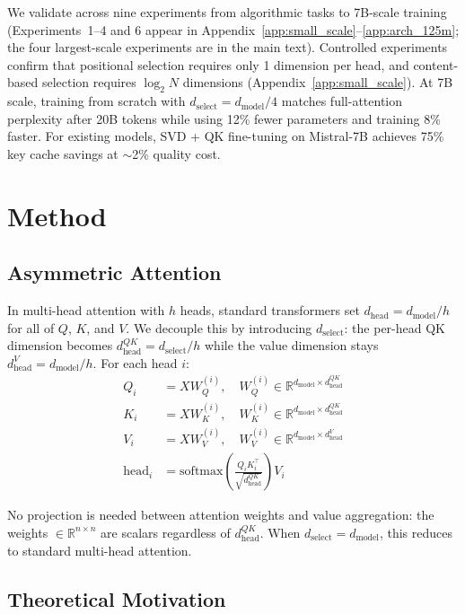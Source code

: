 \documentclass{article} %
\newcommand{\dmodel}{d_{\text{model}}}
\newcommand{\dselect}{d_{\text{select}}}
\newcommand{\dhead}{d_{\text{head}}}
\newcommand{\softmax}{\text{softmax}}
\begin{document}
We validate across nine experiments from algorithmic tasks to 7B-scale training (Experiments~1--4 and 6 appear in Appendix~\ref{app:small_scale}--\ref{app:arch_125m}; the four largest-scale experiments are in the main text). Controlled experiments confirm that positional selection requires only 1 dimension per head, and content-based selection requires $\log_2 N$ dimensions (Appendix~\ref{app:small_scale}). At 7B scale, training from scratch with $\dselect = \dmodel/4$ matches full-attention perplexity after 20B tokens while using 12\% fewer parameters and training 8\% faster. For existing models, SVD + QK fine-tuning on Mistral-7B achieves 75\% key cache savings at $\sim$2\% quality cost.


\section{Method}

\subsection{Asymmetric Attention}

In multi-head attention with $h$ heads, standard transformers set $\dhead = \dmodel / h$ for all of $Q$, $K$, and $V$. We decouple this by introducing $\dselect$: the per-head QK dimension becomes $d_{\text{head}}^{QK} = \dselect / h$ while the value dimension stays $d_{\text{head}}^{V} = \dmodel / h$. For each head $i$:
\begin{align}
Q_i &= XW_Q^{(i)}, \quad W_Q^{(i)} \in \mathbb{R}^{\dmodel \times d_{\text{head}}^{QK}} \\
K_i &= XW_K^{(i)}, \quad W_K^{(i)} \in \mathbb{R}^{\dmodel \times d_{\text{head}}^{QK}} \\
V_i &= XW_V^{(i)}, \quad W_V^{(i)} \in \mathbb{R}^{\dmodel \times d_{\text{head}}^{V}} \\
\text{head}_i &= \softmax\!\left(\frac{Q_i K_i^\top}{\sqrt{d_{\text{head}}^{QK}}}\right) V_i
\end{align}

No projection is needed between attention weights and value aggregation: the weights $\in \mathbb{R}^{n \times n}$ are scalars regardless of $d_{\text{head}}^{QK}$. When $\dselect = \dmodel$, this reduces to standard multi-head attention.

\subsection{Theoretical Motivation}\label{sec:theory}
\end{document}
